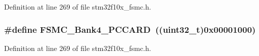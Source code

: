 Definition at line 269 of file stm32f10x\+\_\+fsmc.\+h.

\subsubsection[{\texorpdfstring{F\+S\+M\+C\+\_\+\+Bank4\+\_\+\+P\+C\+C\+A\+RD}{FSMC_Bank4_PCCARD}}]{\setlength{\rightskip}{0pt plus 5cm}\#define F\+S\+M\+C\+\_\+\+Bank4\+\_\+\+P\+C\+C\+A\+RD~(({\bf uint32\+\_\+t})0x00001000)}\hypertarget{group___f_s_m_c___p_c_c_a_r_d___bank_gad08ce7c7afc462f3d9ef085b05d42387}{}\label{group___f_s_m_c___p_c_c_a_r_d___bank_gad08ce7c7afc462f3d9ef085b05d42387}


Definition at line 269 of file stm32f10x\+\_\+fsmc.\+h.

